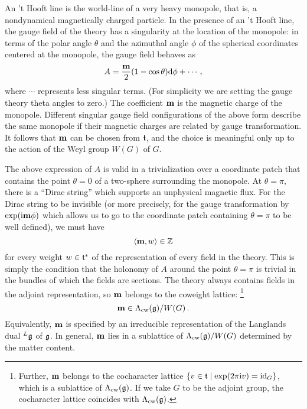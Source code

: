 An 't Hooft line is the world-line of a very heavy monopole, that is, a
nondynamical magnetically charged particle.  In the presence of an 't
Hooft line, the gauge field of the theory has a singularity at the
location of the monopole: in terms of the polar angle $\theta$ and the
azimuthal angle $\phi$ of the spherical coordinates centered at the
monopole, the gauge field behaves as
\begin{equation}
  \label{eq:monopole}
  A = \frac{\mathbf{m}}{2} (1 - \cos\theta) \mathrm{d}\phi + \dotsb \,,
\end{equation}
where $\dotsb$ represents less singular terms.  (For simplicity we are
setting the gauge theory theta angles to zero.)  The coefficient
$\mathbf{m}$ is the magnetic charge of the monopole.  Different singular
gauge field configurations of the above form describe the same
monopole if their magnetic charges are related by gauge
transformation.  It follows that $\mathbf{m}$ can be chosen from $\mathfrak{t}$,
and the choice is meaningful only up to the action of the Weyl group
$W(G)$ of $G$.

The above expression of $A$ is valid in a trivialization over a
coordinate patch that contains the point $\theta = 0$ of a two-sphere
surrounding the monopole.  At $\theta = \pi$, there is a ``Dirac
string'' which supports an unphysical magnetic flux.  For the Dirac
string to be invisible
(or more precisely, for the gauge transformation by $\exp(\mathrm{i} \mathbf{m} \phi)$
which allows us to go to the coordinate patch containing $\theta=\pi$
to be well defined), we must have
\begin{equation}
  \langle\mathbf{m}, w\rangle \in \mathbb{Z}
\end{equation}
for every weight $w \in \mathfrak{t}^*$ of the representation of every field in
the theory.  This is simply the condition that the holonomy of $A$
around the point $\theta = \pi$ is trivial in the bundles of which the
fields are sections.  The theory always contains fields in the adjoint
representation, so $\mathbf{m}$ belongs to the coweight lattice:%
%
\footnote{Further, $\mathbf{m}$ belongs to the cocharacter lattice
  $\{v \in \mathfrak{t} \mid \exp(2\pi\mathrm{i} v) = \mathop{\mathrm{id}}\nolimits_G\}$, which is a sublattice
  of $\Lambda_{\mathrm{cw}}(\mathfrak{g})$.  If we take $G$ to be the adjoint group, the
  cocharacter lattice coincides with $\Lambda_{\mathrm{cw}}(\mathfrak{g})$.}
%
\begin{equation}
  \mathbf{m} \in \Lambda_{\mathrm{cw}}(\mathfrak{g})/W(G) \,.
\end{equation}
Equivalently, $\mathbf{m}$ is specified by an irreducible representation
of the Langlands dual ${}^L\mathfrak{g}$ of $\mathfrak{g}$.  In general, $\mathbf{m}$ lies
in a sublattice of $\Lambda_{\mathrm{cw}}(\mathfrak{g})/W(G)$ determined by the matter
content.

